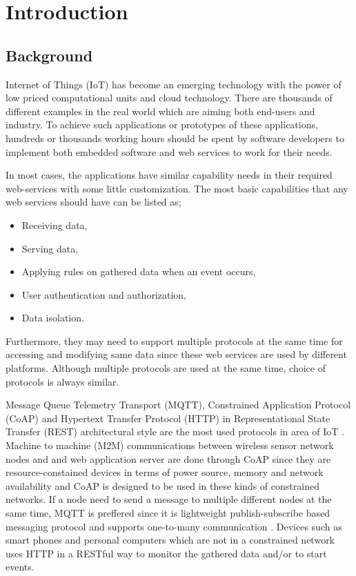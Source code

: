 
\chapter{Introduction}\label{chapter:introduction}

\section{Background}
Internet of Things (IoT) has become an emerging technology with the power of low priced computational units and cloud technology. There are thousands of different examples in the real world which are aiming both end-users and industry. To achieve such applications or prototypes of these applications, hundreds or thousands working hours should be spent by software developers to implement both embedded software and web services to work for their needs. 

In most cases, the applications have similar capability needs in their required web-services with some little customization. The most basic capabilities that any web services should have can be listed as;
\begin{itemize}
  \item Receiving data,
  \item Serving data,
  \item Applying rules on gathered data when an event occurs,
  \item User authentication and authorization,
  \item Data isolation.
\end{itemize}
 Furthermore, they may need to support multiple protocols at the same time for accessing and modifying same data since these web services are used by different platforms. Although multiple protocols are used at the same time, choice of protocols is always similar. 

 Message Queue Telemetry Transport (MQTT), Constrained Application Protocol (CoAP) and Hypertext Transfer Protocol (HTTP) in Representational State Transfer (REST) architectural style are the most used protocols in area of IoT \cite{8246418,8070130}. Machine to machine (M2M) communications between wireless sensor network nodes and and web application server are done through CoAP since they are resource-constained devices in terms of power source, memory and network availability and CoAP is designed to be used in these kinds of constrained networks. If a node need to send a message to multiple different nodes at the same time, MQTT is preffered since it is lightweight publish-subscribe based messaging protocol and supports one-to-many communication \cite{mqtt}. Devices such as smart phones and personal computers which are not in a constrained network uses HTTP in a RESTful way to monitor the gathered data and/or to start events.

